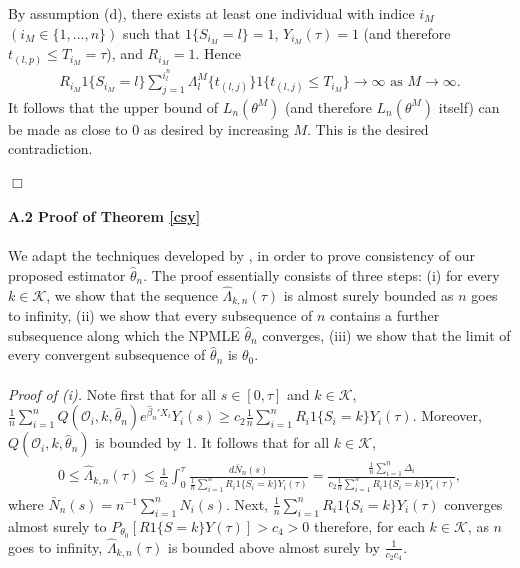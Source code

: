 \documentclass{statsoc}
\begin{document}
By assumption (d), there exists at least one individual with indice $i_M$ $(i_M\in\{1,\ldots,n\})$ such that $1\{S_{i_M}=l\}=1$, $Y_{i_M}(\tau)=1$ (and therefore $t_{(l,p)}\leq T_{i_M}=\tau$), and $R_{i_M}=1$. Hence 
\begin{eqnarray*}
R_{i_M}1\{S_{i_M}=l\}\sum_{j=1}^{i_l^n}\Lambda^M_l\{t_{(l,j)}\}1\{t_{(l,j)}\leq T_{i_M}\}\rightarrow \infty \mbox{ as } M\rightarrow \infty.
\end{eqnarray*}
It follows that the upper bound of $L_n(\theta^M)$ (and therefore $L_n(\theta^M)$ itself) can be made as close to 0 as desired by increasing $M$. This is the desired contradiction.
\\
\\
$\Box$
\\
\\
\textbf{A.2 Proof of Theorem \ref{csy}}
\\\\
We adapt the techniques developed by \cite{murphy94}, in order to prove consistency of our proposed estimator $\widehat\theta_n$. The proof essentially consists of three steps: (i) for every $k\in\mathcal K$, we show that the sequence $\widehat\Lambda_{k,n}(\tau)$ is almost surely bounded as $n$ goes to infinity, (ii) we show that every subsequence of $n$ contains a further subsequence along which the NPMLE $\widehat\theta_n$ converges, (iii) we show that the limit of every convergent subsequence of $\widehat\theta_n$ is $\theta_0$.
\\\\
\textit{Proof of (i).} Note first that for all $s\in[0,\tau]$ and $k\in\mathcal K$, $\frac{1}{n}\sum_{i=1}^nQ(\mathcal O_i,k,\widehat\theta_n) e^{\widehat\beta_n'X_i}Y_i(s)\geq c_2\frac{1}{n}\sum_{i=1}^nR_i1\{S_i=k\}Y_i(\tau)$. Moreover, $Q(\mathcal O_i,k,\widehat\theta_n)$ is bounded by 1. It follows that for all $k\in\mathcal K$,
\begin{eqnarray*}
0\leq \widehat\Lambda_{k,n}(\tau)\leq \frac{1}{c_2}\int_0^\tau\frac{d\bar N_n(s)}{\frac{1}{n}\sum_{i=1}^nR_i1\{S_i=k\}Y_i(\tau)}= \frac{\frac{1}{n}\sum_{i=1}^n \Delta_i}{c_2\frac{1}{n}\sum_{i=1}^nR_i1\{S_i=k\}Y_i(\tau)},
\end{eqnarray*}
where $\bar N_n(s)=n^{-1}\sum_{i=1}^n N_i(s)$. Next, $\frac{1}{n}\sum_{i=1}^nR_i1\{S_i=k\}Y_i(\tau)$ converges almost surely to $P_{\theta_0}[R1\{S=k\}Y(\tau)]>c_4>0$ therefore, for each $k\in\mathcal K$, as $n$ goes to infinity, $\widehat\Lambda_{k,n}(\tau)$ is bounded above almost surely by $\frac{1}{c_2c_4}$.
\\\\
\end{document}
